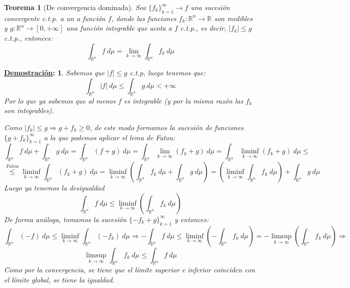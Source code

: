 \documentclass[10pt,a4paper,openright]{book}
\theoremstyle{break}
\newtheorem*{theo}{Teorema}
\newtheorem*{demo}{\underline{Demostración}:}
\newcommand{\dif}[1]{\ d#1}
\begin{document}
\begin{theo}[De convergencia dominada]
Sea $\{f_k\}_{k=1}^{\infty}\rightarrow f$ una sucesión convergente c.t.p. a un a función $f$, donde las funciones $f_k: \mathbb{R}^n \rightarrow \mathbb{R}$ son medibles y $g: \mathbb{R}^n \rightarrow \left[0, +\infty\right]$ una función integrable que acota a $f$ c.t.p., es decir, $\vert f_k \vert \le g$ c.t.p., entonces:
$$\int_{\mathbb{R}^n} f \dif{\mu} = \lim_{k \rightarrow \infty} \int_{\mathbb{R}^n} f_k \dif{\mu}$$
\end{theo}
\begin{demo}
Sabemos que $\vert f \vert \le g$ c.t.p, luego tenemos que:
$$\int_{\mathbb{R}^n} \vert f \vert \dif{\mu} \le \int_{\mathbb{R}^n} g \dif{\mu} < +\infty$$
Por lo que ya sabemos que al menos $f$ es integrable (y por la misma razón las $f_k$ son integrables).

Como $\vert f_k \vert \le g \Rightarrow g + f_k \ge 0$, de este modo formamos la sucesión de funciones $\{g + f_k\}_{k=1}^{\infty}$ a la que podemos aplicar el lema de Fatou: 
$$\int_{\mathbb{R}^n} f \dif{\mu} + \int_{\mathbb{R}^n} g \dif{\mu} = \int_{\mathbb{R}^n} \left(f + g\right) \dif{\mu} = \int_{\mathbb{R}^n} \lim_{k \rightarrow \infty} \left(f_k + g\right) \dif{\mu} =\int_{\mathbb{R}^n} \liminf_{k \rightarrow \infty} \left(f_k + g\right)  \dif{\mu} \leq$$
$$ \stackrel{Fatou}{\le} \liminf_{k \rightarrow \infty}\int_{\mathbb{R}^n} \left(f_k + g\right) \dif{\mu} = \liminf_{k \rightarrow \infty} \left( \int_{\mathbb{R}^n} f_k \dif{\mu} + \int_{\mathbb{R}^n} g \dif{\mu} \right) = \left(\liminf_{k \rightarrow \infty} \int_{\mathbb{R}^n} f_k \dif{\mu}  \right) + \int_{\mathbb{R}^n} g \dif{\mu}$$
Luego ya tenemos la desigualdad
$$\int_{\mathbb{R}^n} f \dif{\mu} \le \liminf_{k \rightarrow \infty}\left( \int_{\mathbb{R}^n} f_k \dif{\mu}\right)$$
De forma análoga, tomamos la sucesión $\{-f_k + g\}_{k=1}^{\infty}$ y entonces:
$$\int_{\mathbb{R}^n} \left(-f\right) \dif{\mu} \le \liminf_{k \rightarrow \infty} \int_{\mathbb{R}^n} \left(-f_k\right) \dif{\mu} \Rightarrow - \int_{\mathbb{R}^n} f \dif{\mu} \le \liminf_{k \rightarrow \infty} \left(-\int_{\mathbb{R}^n} f_k \dif{\mu} \right) = -\limsup_{k \rightarrow \infty} \left(\int_{\mathbb{R}^n} f_k \dif{\mu} \right) \Rightarrow$$
$$\limsup_{k \rightarrow \infty} \int_{\mathbb{R}^n} f_k \dif{\mu} \le \int_{\mathbb{R}^n} f \dif{\mu} $$
Como por la convergencia, se tiene que el límite superior e inferior coinciden con el límite global, se tiene la igualdad.
\end{demo}
\end{document}
